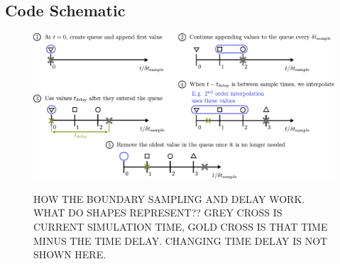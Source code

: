 \subsection{Code Schematic}


\begin{figure}[t]
\centering
\includegraphics[scale=0.65]{assets/imgs/delay_bc_queue.pdf}
\label{fig:delay-queue}
\caption{HOW THE BOUNDARY SAMPLING AND DELAY WORK. WHAT DO SHAPES REPRESENT?? GREY CROSS IS CURRENT SIMULATION TIME, GOLD CROSS IS THAT TIME MINUS THE TIME DELAY. CHANGING TIME DELAY IS NOT SHOWN HERE.}
\end{figure}

